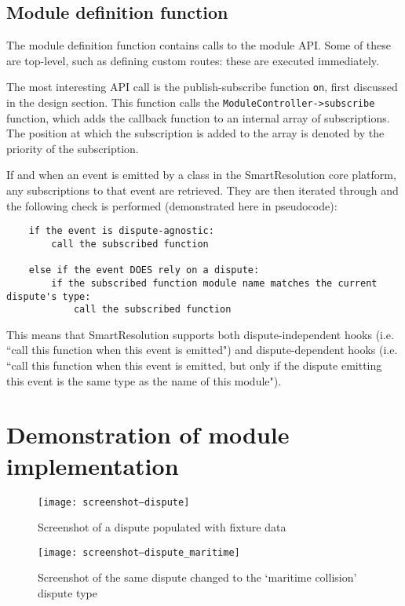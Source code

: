 \subsection{Module definition function}

The module definition function contains calls to the module API. Some of these are top-level, such as defining custom routes: these are executed immediately.

The most interesting API call is the publish-subscribe function \lstinline{on}, first discussed in the design section. This function calls the \lstinline{ModuleController->subscribe} function, which adds the callback function to an internal array of subscriptions. The position at which the subscription is added to the array is denoted by the priority of the subscription.

If and when an event is emitted by a class in the SmartResolution core platform, any subscriptions to that event are retrieved. They are then iterated through and the following check is performed (demonstrated here in pseudocode):

\begin{lstlisting}
	if the event is dispute-agnostic:
	    call the subscribed function
	
	else if the event DOES rely on a dispute:
	    if the subscribed function module name matches the current dispute's type:
	        call the subscribed function
\end{lstlisting}

This means that SmartResolution supports both dispute-independent hooks (i.e. ``call this function when this event is emitted") and dispute-dependent hooks (i.e. ``call this function when this event is emitted, but only if the dispute emitting this event is the same type as the name of this module"). 

\section{Demonstration of module implementation}

\begin{figure}[h!]
  \centering
    \ifimages
    \texttt{[image: screenshot--dispute]}
    \fi
  \caption{Screenshot of a dispute populated with fixture data}
  \label{screenshot:dispute}
\end{figure}

\begin{figure}[h!]
  \centering
    \ifimages
    \texttt{[image: screenshot--dispute\_maritime]}
    \fi
  \caption{Screenshot of the same dispute changed to the `maritime collision' dispute type}
  \label{screenshot:disputeMaritime}
\end{figure}

